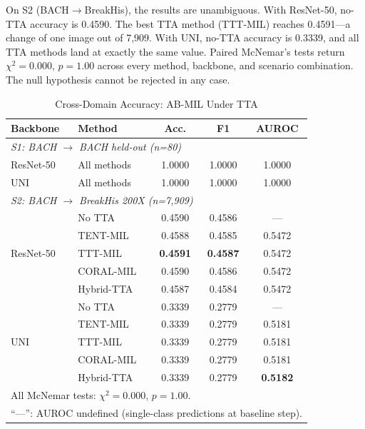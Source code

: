 \documentclass[conference]{IEEEtran}
\begin{document}
On S2 (BACH$\rightarrow$BreakHis), the results are unambiguous. With ResNet-50, no-TTA accuracy is 0.4590. The best TTA method (TTT-MIL) reaches 0.4591---a change of one image out of 7,909. With UNI, no-TTA accuracy is 0.3339, and all TTA methods land at exactly the same value. Paired McNemar's tests return $\chi^2 = 0.000$, $p = 1.00$ across every method, backbone, and scenario combination. The null hypothesis cannot be rejected in any case.

\begin{table}[!hbt]
\caption{Cross-Domain Accuracy: AB-MIL Under TTA}
\label{tab:cross_domain}
\centering
\begin{tabular}{llccc}
\toprule
\textbf{Backbone} & \textbf{Method} & \textbf{Acc.} & \textbf{F1} & \textbf{AUROC} \\
\midrule
\multicolumn{5}{l}{\textit{S1: BACH $\rightarrow$ BACH held-out (n=80)}} \\
ResNet-50 & All methods & 1.0000 & 1.0000 & 1.0000 \\
UNI & All methods & 1.0000 & 1.0000 & 1.0000 \\
\midrule
\multicolumn{5}{l}{\textit{S2: BACH $\rightarrow$ BreakHis 200X (n=7,909)}} \\
\multirow{5}{*}{ResNet-50}
 & No TTA        & 0.4590 & 0.4586 & --- \\
 & TENT-MIL      & 0.4588 & 0.4585 & 0.5472 \\
 & TTT-MIL       & \textbf{0.4591} & \textbf{0.4587} & 0.5472 \\
 & CORAL-MIL     & 0.4590 & 0.4586 & 0.5472 \\
 & Hybrid-TTA    & 0.4587 & 0.4584 & 0.5472 \\
\midrule
\multirow{5}{*}{UNI}
 & No TTA        & 0.3339 & 0.2779 & --- \\
 & TENT-MIL      & 0.3339 & 0.2779 & 0.5181 \\
 & TTT-MIL       & 0.3339 & 0.2779 & 0.5181 \\
 & CORAL-MIL     & 0.3339 & 0.2779 & 0.5181 \\
 & Hybrid-TTA    & 0.3339 & 0.2779 & \textbf{0.5182} \\
\bottomrule
\multicolumn{5}{l}{All McNemar tests: $\chi^2 = 0.000$, $p = 1.00$.} \\
\multicolumn{5}{l}{``---'': AUROC undefined (single-class predictions at baseline step).} \\
\end{tabular}
\end{table}
\end{document}
